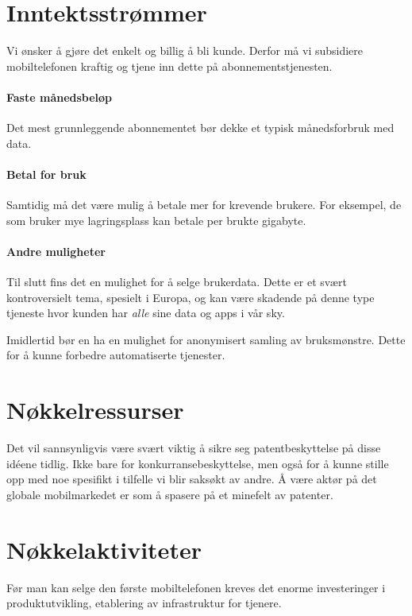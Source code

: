 \section{Inntektsstrømmer}

Vi ønsker å gjøre det enkelt og billig å bli kunde. Derfor må vi subsidiere
mobiltelefonen kraftig og tjene inn dette på abonnementstjenesten.

\paragraph{Faste månedsbeløp}
Det mest grunnleggende abonnementet bør dekke et typisk månedsforbruk med data.

\paragraph{Betal for bruk}
Samtidig må det være mulig å betale mer for krevende brukere. For eksempel, de
som bruker mye lagringsplass kan betale per brukte gigabyte.

\paragraph{Andre muligheter}
Til slutt fins det en mulighet for å selge brukerdata. Dette er et svært
kontroversielt tema, spesielt i Europa, og kan være skadende på denne type
tjeneste hvor kunden har \textit{alle} sine data og apps i vår sky.  

Imidlertid bør en ha en mulighet for anonymisert samling av bruksmønstre. Dette
for å kunne forbedre automatiserte tjenester.

\section{Nøkkelressurser}

Det vil sannsynligvis være svært viktig å sikre seg patentbeskyttelse på disse
idéene tidlig. Ikke bare for konkurransebeskyttelse, men også for å kunne
stille opp med noe spesifikt i tilfelle vi blir saksøkt av andre. Å være aktør
på det globale mobilmarkedet er som å spasere på et minefelt av patenter.

\section{Nøkkelaktiviteter}

Før man kan selge den første mobiltelefonen kreves det enorme investeringer i
produktutvikling, etablering av infrastruktur for tjenere.

